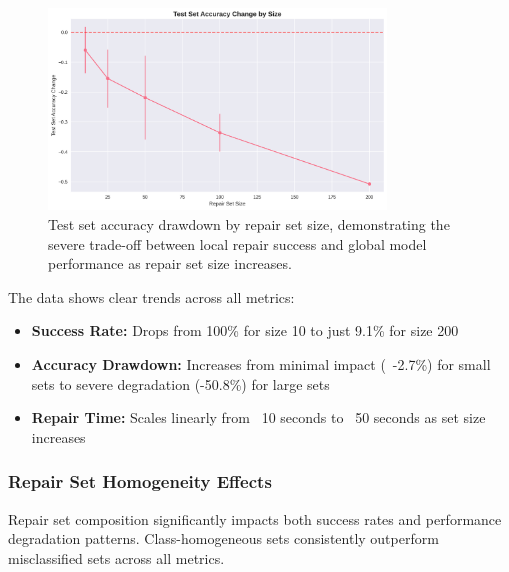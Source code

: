 \documentclass{article}
\begin{document}
\begin{figure}[h]
	\centering
	\includegraphics[width=0.8\textwidth]{results/one_shot_analysis/accuracy/accuracy_change_by_size.png}
	\caption{Test set accuracy drawdown by repair set size, demonstrating the severe trade-off between local repair success and global model performance as repair set size increases.}
	\label{fig:accuracy_drawdown_by_size}
\end{figure}

The data shows clear trends across all metrics:
\begin{itemize}
	\item \textbf{Success Rate:} Drops from 100\% for size 10 to just 9.1\% for size 200
	\item \textbf{Accuracy Drawdown:} Increases from minimal impact (~-2.7\%) for small sets to severe degradation (-50.8\%) for large sets
	\item \textbf{Repair Time:} Scales linearly from ~10 seconds to ~50 seconds as set size increases
\end{itemize}

\subsubsection{Repair Set Homogeneity Effects}

Repair set composition significantly impacts both success rates and performance degradation patterns. Class-homogeneous sets consistently outperform misclassified sets across all metrics.
\end{document}

